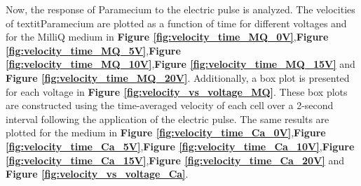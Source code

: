 Now, the response of Paramecium to the electric pulse is analyzed. The velocities of textit{Paramecium are plotted as a function of time for different voltages and for the MilliQ medium in \textbf{Figure \ref{fig:velocity_time_MQ_0V}},\textbf{Figure \ref{fig:velocity_time_MQ_5V}}},\textbf{Figure \ref{fig:velocity_time_MQ_10V}},\textbf{Figure \ref{fig:velocity_time_MQ_15V}} and \textbf{Figure \ref{fig:velocity_time_MQ_20V}}. Additionally, a box plot is presented for each voltage in \textbf{Figure \ref{fig:velocity_vs_voltage_MQ}}. These box plots are constructed using the time-averaged velocity of each cell over a 2-second interval following the application of the electric pulse. The same results are plotted for the  medium in \textbf{Figure \ref{fig:velocity_time_Ca_0V}},\textbf{Figure \ref{fig:velocity_time_Ca_5V}},\textbf{Figure \ref{fig:velocity_time_Ca_10V}},\textbf{Figure \ref{fig:velocity_time_Ca_15V}},\textbf{Figure \ref{fig:velocity_time_Ca_20V}} and \textbf{Figure \ref{fig:velocity_vs_voltage_Ca}}.
